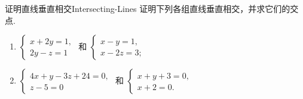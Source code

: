 \begin{problem}{证明直线垂直相交}{Intersecting-Lines}
    证明下列各组直线垂直相交，并求它们的交点.
    \begin{enumerate}
        \item $\begin{cases} x + 2y = 1, \\ 2y - z = 1 \end{cases}$ 和 $\begin{cases} x - y = 1, \\ x - 2z = 3; \end{cases}$
        \item $\begin{cases} 4x + y - 3z + 24 = 0, \\ z - 5 = 0 \end{cases}$ 和 $\begin{cases} x + y + 3 = 0, \\ x + 2 = 0. \end{cases}$
    \end{enumerate}
\end{problem}

